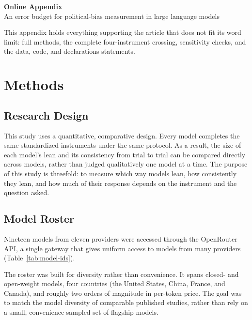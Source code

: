 \documentclass[12pt]{article}
\begin{document}
\begin{center}
{\LARGE\textbf{Online Appendix}}\\[0.8em]
{\large An error budget for political-bias measurement in large language models}
\end{center}
\vspace{1em}
\singlespacing
\renewcommand{\thesection}{\S\arabic{section}}
\renewcommand{\thetable}{S\arabic{table}}
\renewcommand{\thefigure}{S\arabic{figure}}
\setcounter{section}{0}\setcounter{table}{0}\setcounter{figure}{0}

\noindent This appendix holds everything supporting the article that does not
fit its word limit: full methods, the complete four-instrument crossing,
sensitivity checks, and the data, code, and declarations statements.

\section{Methods}
\label{si:methods}

\subsection{Research Design}

This study uses a quantitative, comparative design. Every model completes the same standardized
instruments under the same protocol. As a result, the size of each model's lean and its consistency from
trial to trial can be compared directly across models, rather than judged qualitatively one model at a
time. The purpose of this study is threefold: to measure which way models lean, how consistently they
lean, and how much of their response depends on the instrument and the question asked.

\subsection{Model Roster}
\label{si:model-roster}

Nineteen models from eleven providers were accessed through the OpenRouter API, a single gateway
that gives uniform access to models from many providers (Table~\ref{tab:model-ids}).

The roster was built for diversity rather than convenience. It spans closed- and open-weight models, four
countries (the United States, China, France, and Canada), and roughly two orders of magnitude in
per-token price. The goal was to match the model diversity of comparable published studies, rather than
rely on a small, convenience-sampled set of flagship models.
\end{document}
